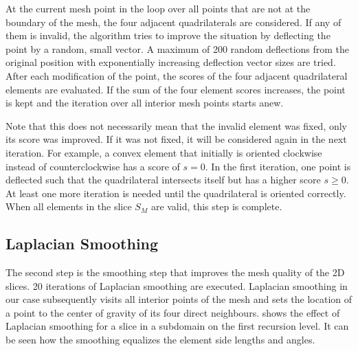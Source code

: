 At the current mesh point in the loop over all points that are not at the boundary of the mesh, the four adjacent quadrilaterals are considered. If any of them is invalid, the algorithm tries to improve the situation by deflecting the point by a random, small vector. A maximum of 200 random deflections from the original position with exponentially increasing deflection vector sizes are tried. After each modification of the point, the scores of the four adjacent quadrilateral elements are evaluated. If the sum of the four element scores increases, the point is kept and the iteration over all interior mesh points starts anew. 

Note that this does not necessarily mean that the invalid element was fixed, only its score was improved. If it was not fixed, it will be considered again in the next iteration. For example, a convex element that initially is oriented clockwise instead of counterclockwise has a score of $s=0$. In the first iteration, one point is deflected such that the quadrilateral intersects itself but has a higher score $s\geq 0$. At least one more iteration is needed until the quadrilateral is oriented correctly.
When all elements in the slice $S_M$ are valid, this step is complete.

\subsection{Laplacian Smoothing}
The second step is the smoothing step that improves the mesh quality of the 2D slices. \num{20} iterations of Laplacian smoothing \cite{field1988laplacianSmoothingAndDelaunayTriangulations} are executed. Laplacian smoothing in our case subsequently visits all interior points of the mesh and sets the location of a point to the center of gravity of its four direct neighbours.
 shows the effect of Laplacian smoothing for a slice in a subdomain on the first recursion level. It can be seen how the smoothing equalizes the element side lengths and angles.

